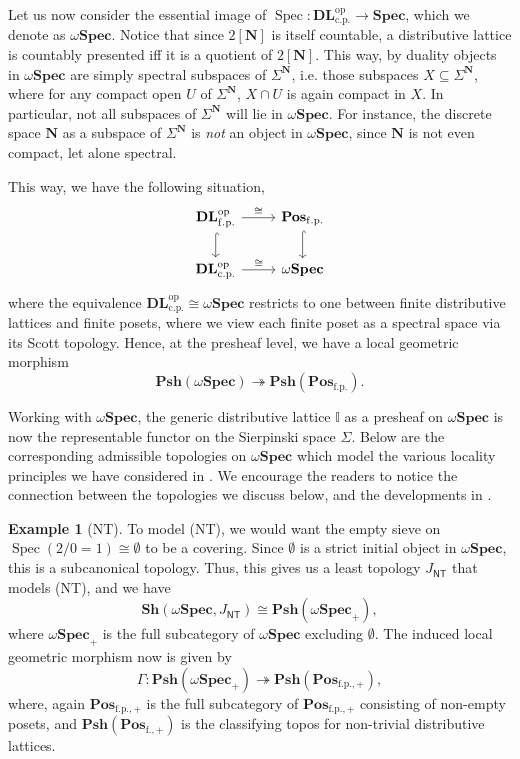 \documentclass[12pt]{amsart}
\theoremstyle{definition}
\newtheorem{example}[theorem]{Example}
\newcommand{\mb}[1]{\mathbf{#1}}
\newcommand{\mbb}[1]{\mathbb{#1}}
\newcommand{\I}{\mbb I}
\newcommand{\mr}[1]{\mathrm{#1}}
\newcommand{\ms}[1]{\mathsf{#1}}
\newcommand{\Pos}{\mb{Pos}}
\newcommand{\DL}{\mb{DL}}
\newcommand{\sh}{\mb{Sh}}
\newcommand{\psh}{\mb{Psh}}
\newcommand{\op}{^{\mathrm{op}}}
\newcommand{\surj}{\twoheadrightarrow}
\newcommand{\fp}{_{\mr{f.p.}}}
\newcommand{\cp}{_{\mr{c.p.}}}
\newcommand{\N}{\mb N}
\newcommand{\emp}{\emptyset}
\newcommand{\Spec}{\mb{Spec}}
\newcommand{\wSpec}{\omega\mb{Spec}}
\newcommand{\spec}{\operatorname{Spec}}
\begin{document}
Let us now consider the essential image of $\spec : \DL\cp\op \to \Spec$, which we denote as $\wSpec$. Notice that since $2[\N]$ is itself countable, a distributive lattice is countably presented iff it is a quotient of $2[\N]$. This way, by duality objects in $\wSpec$ are simply spectral subspaces of $\Sigma^\N$, i.e. those subspaces $X \subseteq \Sigma^\N$, where for any compact open $U$ of $\Sigma^\N$, $X \cap U$ is again compact in $X$. In particular, not all subspaces of $\Sigma^\N$ will lie in $\wSpec$. For instance, the discrete space $\N$ as a subspace of $\Sigma^\N$ is \emph{not} an object in $\wSpec$, since $\N$ is not even compact, let alone spectral.

This way, we have the following situation,
\[
\begin{tikzcd}
  \DL\fp\op \ar[r, "\cong"] \ar[d, hook] & \Pos\fp \ar[d, hook] \\ 
  \DL\cp\op \ar[r, "\cong"] & \wSpec 
\end{tikzcd}
\]
where the equivalence $\DL\cp\op \cong \wSpec$ restricts to one between finite distributive lattices and finite posets, where we view each finite poset as a spectral space via its Scott topology. Hence, at the presheaf level, we have a local geometric morphism
\[ \psh(\wSpec) \surj \psh(\Pos\fp). \]

Working with $\wSpec$, the generic distributive lattice $\I$ as a presheaf on $\wSpec$ is now the representable functor on the Sierpinski space $\Sigma$. Below are the corresponding admissible topologies on $\wSpec$ which model the various locality principles we have considered in . We encourage the readers to notice the connection between the topologies we discuss below, and the developments in .

\begin{example}[NT]
  To model (NT), we would want the empty sieve on $\spec(2/0=1) \cong \emp$ to be a covering. Since $\emp$ is a strict initial object in $\wSpec$, this is a subcanonical topology. Thus, this gives us a least topology $J_{\ms{NT}}$ that models (NT), and we have
  \[ \sh(\wSpec,J_{\ms{NT}}) \cong \psh(\wSpec_+), \]
  where $\wSpec_+$ is the full subcategory of $\wSpec$ excluding $\emp$. The induced local geometric morphism now is given by 
  \[ \Gamma : \psh(\wSpec_+) \surj \psh(\Pos_{\mr{f.p.,+}}), \]
  where, again $\Pos_{\mr{f.p.,+}}$ is the full subcategory of $\Pos_{\mr{f.p.,+}}$ consisting of non-empty posets, and $\psh(\Pos_{\mr{f.,+}})$ is the classifying topos for non-trivial distributive lattices.
\end{example}
\end{document}
